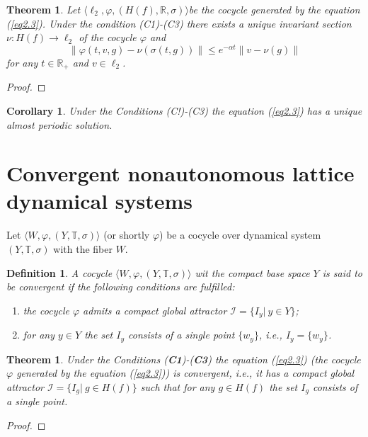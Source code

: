 \documentclass{amsart}%
\newtheorem{theorem}[lemma]{Theorem}
\newtheorem{coro}[lemma]{Corollary}
\newtheorem{definition}[lemma]{Definition}
\begin{document}
\begin{theorem}\label{thAPM1} Let $\langle \ell_{2} ,\varphi, (H(f),\mathbb
R,\sigma)\rangle$be the cocycle generated by the equation
(\ref{eq2.3}). Under the condition (C1)-(C3) there exists a unique
invariant section $\nu :H(f)\to \ell_{2}$ of the cocycle $\varphi$
and
\begin{equation}\label{eqAPM1}
\|\varphi(t,v,g)-\nu(\sigma(t,g))\|\le e^{-\alpha t}\|v-\nu(g)\|
\end{equation}
for any $t\in \mathbb R_{+}$ and $v\in \ell_{2}$.
\end{theorem}
\begin{proof}

\end{proof}


\begin{coro}\label{corAPM1} Under the Conditions (C!)-(C3) the
equation (\ref{eq2.3}) has a unique almost periodic solution.
\end{coro}

\section{Convergent nonautonomous lattice dynamical systems}

Let $\langle W,\varphi,(Y,\mathbb T,\sigma)\rangle$ (or shortly
$\varphi$) be a cocycle over dynamical system $(Y,\mathbb
T,\sigma)$ with the fiber $W$.

\begin{definition}\label{defCS1} A cocycle $\langle W,\varphi,(Y,\mathbb
T,\sigma)\rangle$ wit the compact base space $Y$ is said to be
convergent if the following conditions are fulfilled:
\begin{enumerate}
\item the cocycle $\varphi$ admits a compact global attractor
$\mathcal I =\{I_{y}|\ y\in Y\}$; \item for any $y\in Y$ the set
$I_{y}$ consists of a single point $\{w_{y}\}$, i.e.,
$I_{y}=\{w_y\}$.
\end{enumerate}
\end{definition}


\begin{theorem}\label{thCGA_2} Under the Conditions
(\textbf{C1})-(\textbf{C3}) the equation (\ref{eq2.3}) (the
cocycle $\varphi$ generated by the equation (\ref{eq2.3})) is
convergent, i.e., it has a compact global attractor $\mathcal I
=\{I_{g}|\ g\in H(f)\}$ such that for any $g\in H(f)$ the set
$I_{g}$ consists of a single point.
\end{theorem}
\begin{proof}

\end{proof}
\end{document}
